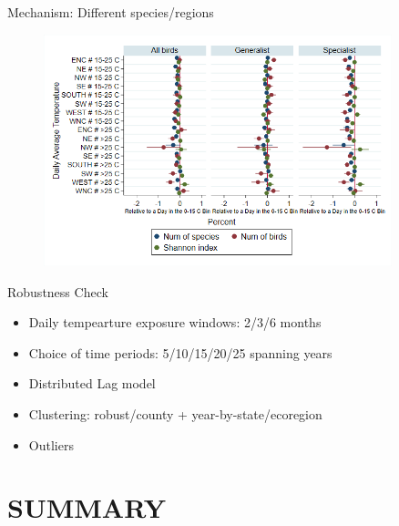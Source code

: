 \documentclass[handout]{beamer}
\begin{document}
\begin{frame}{Mechanism: Different species/regions}
  \begin{figure}[h]
  \centering
  \includegraphics[width=0.9\textwidth]{bird_figure3.png}
  \end{figure}
\end{frame}

\begin{frame}{Robustness Check}
 \begin{itemize}
   \item Daily tempearture exposure windows: 2/3/6 months
   \item Choice of time periods: 5/10/15/20/25 spanning years
   \item Distributed Lag model
   \item Clustering: robust/county + year-by-state/ecoregion
   \item Outliers
 \end{itemize}
\end{frame}



\section*{SUMMARY}
\end{document}
